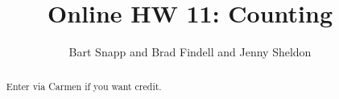\documentclass[handout,space,nooutcomes]{xourse}
\title{Online HW 11: Counting}
\author{Bart Snapp and Brad Findell and Jenny Sheldon}
\begin{document}
\begin{abstract}
Enter via Carmen if you want credit.   
\end{abstract}
\maketitle


\end{document}
